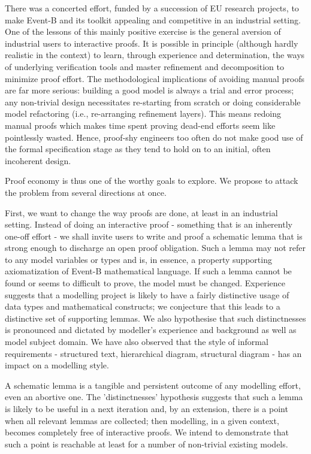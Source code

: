 \documentclass[twocolumn,a4paper,10pt]{article}
\begin{document}
There was a concerted effort, funded by a succession of EU research projects, to make Event-B and its toolkit appealing and competitive in an industrial setting. One of the lessons of this mainly positive exercise is the general aversion of industrial users to interactive proofs. It is possible in principle (although hardly realistic in the context) to learn, through experience and determination, the ways of underlying verification tools and master refinement and decomposition to minimize proof effort. The methodological implications of avoiding manual proofs are far more serious: building a good model is always a trial and error process; any non-trivial design necessitates re-starting from scratch or doing considerable model refactoring (i.e., re-arranging refinement layers). This means redoing manual proofs which makes time spent proving dead-end efforts seem like pointlessly wasted. Hence, proof-shy engineers too often do not make good use of the formal specification stage as they tend to hold on to an initial, often incoherent design. 

Proof economy is thus one of the worthy goals to explore. We propose to attack the problem from several directions at once. 

First, we want to change the way proofs are done, at least in an industrial setting. Instead of doing an interactive proof - something that is an inherently one-off effort - we shall invite users to write and proof a schematic lemma that is strong enough to discharge an open proof obligation. Such a lemma may not refer to any model variables or types and is, in essence, a property supporting axiomatization of Event-B mathematical language. If such a lemma cannot be found or seems to difficult to prove, the model must be changed. Experience suggests that a modelling project is likely to have a fairly distinctive usage of data types and mathematical constructs; we conjecture that this leads to a distinctive set of supporting lemmas. We also hypothesise that such distinctnesses is pronounced and dictated by modeller's experience and background as well as model subject domain. We have also observed that the style of informal requirements - structured text, hierarchical diagram, structural diagram - has an impact on a modelling style.

A schematic lemma is a tangible and persistent outcome of any modelling effort, even an abortive one. The 'distinctnesses' hypothesis suggests that such a lemma is likely to be useful in a next iteration and, by an extension, there is a point when all relevant lemmas are collected; then modelling, in a given context, becomes completely free of interactive proofs. We intend to demonstrate that such a point is reachable at least for a number of non-trivial existing models. 
\end{document}
